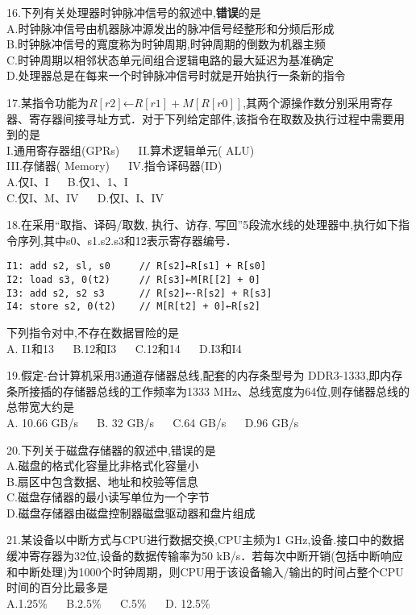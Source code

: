 16.下列有关处理器时钟脉冲信号的叙述中,\textbf{错误}的是 \\
A.时钟脉冲信号由机器脉冲源发出的脉冲信号经整形和分频后形成 \\
B.时钟脉冲信号的寬度称为时钟周期,时钟周期的倒数为机器主频 \\
C.时钟周期以相邻状态单元间组合逻辑电路的最大延迟为基准确定 \\
D.处理器总是在每来一个时钟脉冲信号时就是开始执行一条新的指令

17.某指令功能为$R[r2]$←$R[r1]+M[R[r0]]$,其两个源操作数分别采用寄存器、寄存器间接寻址方式．对于下列给定部件,该指令在取数及执行过程中需要用到的是 \\
I.通用寄存器组(GPRs) $\quad$ II.算术逻辑单元( ALU) \\
III.存储器( Memory) $\quad$ IV.指令译码器(ID) \\
A.仅I、I $\quad$ B.仅1、1、I \\
C.仅I、M、IV $\quad$ D.仅I、I、IV

18.在采用“取指、译码/取数, 执行、访存, 写回”5段流水线的处理器中,执行如下指令序列,其中s0、s1.s2.s3和12表示寄存器编号． \\
\begin{lstlisting}
I1: add s2, sl, s0     // R[s2]←R[s1] + R[s0]
I2: load s3, 0(t2)     // R[s3]←M[R[[2] + 0]
I3: add s2, s2 s3      // R[s2]←-R[s2] + R[s3]
I4: store s2, 0(t2)    // M[R[t2] + 0]←R[s2]
\end{lstlisting}
下列指令对中,不存在数据冒险的是 \\
A. I1和13 $\quad$ B.12和I3 $\quad$ C.12和14 $\quad$ D.I3和I4

19.假定-台计算机采用3通道存储器总线,配套的内存条型号为
DDR3-1333,即内存条所接插的存储器总线的工作频率为1333
MHz、总线宽度为64位,则存储器总线的总带宽大约是 \\
A. 10.66 GB/s $\quad$ B. 32 GB/s $\quad$ C.64 GB/s $\quad$ D.96 GB/s

20.下列关于磁盘存储器的叙述中,错误的是 \\
A.磁盘的格式化容量比非格式化容量小 \\
B.扇区中包含数据、地址和校验等信息 \\
C.磁盘存储器的最小读写单位为一个字节 \\
D.磁盘存储器由磁盘控制器磁盘驱动器和盘片组成

21.某设备以中断方式与CPU进行数据交换,CPU主频为1 GHz,设备.接口中的数据缓冲寄存器为32位,设备的数据传输率为50 kB/s．若每次中断开销(包括中断响应和中断处理)为1000个时钟周期，则CPU用于该设备输入/输出的时间占整个CPU时间的百分比最多是 \\
A.1.25\% $\quad$ B.2.5\% $\quad$ C.5\% $\quad$ D. 12.5\%

